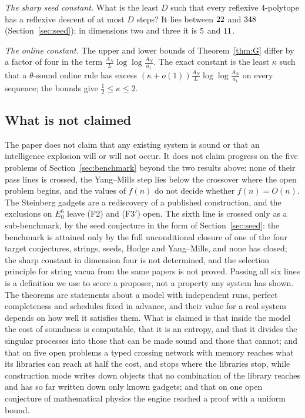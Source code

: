 \emph{The sharp seed constant.} What is the least $D$ such that every reflexive $4$-polytope has a reflexive descent of at most $D$ steps? It lies between $22$ and $348$ (Section~\ref{sec:seed}); in dimensions two and three it is $5$ and $11$.

\emph{The online constant.} The upper and lower bounds of Theorem~\ref{thm:G} differ by a factor of four in the term $\frac{A_{N}}{L}\log\log\frac{A_{N}}{a_{1}}$. The exact constant is the least $\kappa$ such that a $\theta$-sound online rule has excess $(\kappa+o(1))\frac{A_{N}}{L}\log\log\frac{A_{N}}{a_{1}}$ on every sequence; the bounds give $\frac12\le\kappa\le2$.

\subsection{What is not claimed}

The paper does not claim that any existing system is sound or that an intelligence explosion will or will not occur. It does not claim progress on the five problems of Section~\ref{sec:benchmark} beyond the two results above: none of their pass lines is crossed, the Yang--Mills step lies below the crossover where the open problem begins, and the values of $f(n)$ do not decide whether $f(n)=O(n)$. The Steinberg gadgets are a rediscovery of a published construction, and the exclusions on $E_{0}^{6}$ leave (F2) and (F3$'$) open. The sixth line is crossed only as a sub-benchmark, by the seed conjecture in the form of Section~\ref{sec:seed}: the benchmark is attained only by the full unconditional closure of one of the four target conjectures, strings, seeds, Hodge and Yang--Mills, and none has closed; the sharp constant in dimension four is not determined, and the selection principle for string vacua from the same papers is not proved. Passing all six lines is a definition we use to score a proposer, not a property any system has shown. The theorems are statements about a model with independent runs, perfect completeness and schedules fixed in advance, and their value for a real system depends on how well it satisfies them. What is claimed is that inside the model the cost of soundness is computable, that it is an entropy, and that it divides the singular processes into those that can be made sound and those that cannot; and that on five open problems a typed crossing network with memory reaches what its libraries can reach at half the cost, and stops where the libraries stop, while construction mode writes down objects that no combination of the library reaches and has so far written down only known gadgets; and that on one open conjecture of mathematical physics the engine reached a proof with a uniform bound.
